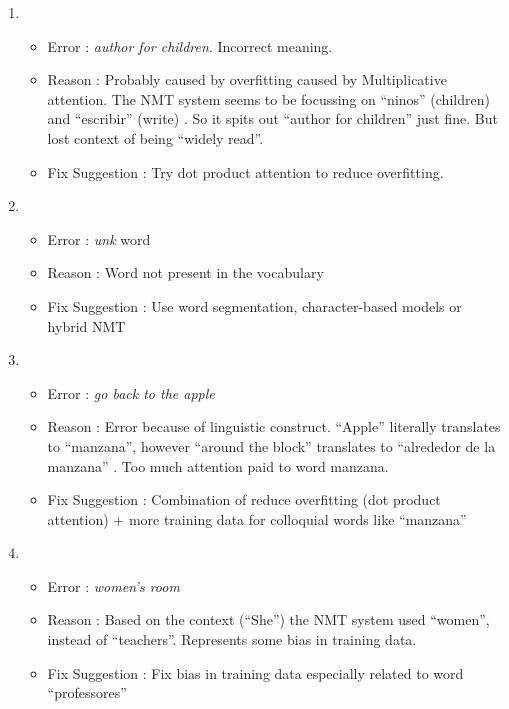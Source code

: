 \documentclass[]{article}
\begin{document}
\begin{enumerate}
\begin{enumerate}
\begin{enumerate}
					\item 	
					\begin{itemize}
						\item Error : \textit{author for children}. Incorrect meaning.
						\item Reason : Probably caused by overfitting caused by Multiplicative attention. The NMT system seems to be focussing on \enquote{ninos} (children) and \enquote{escribir} (write) . So it spits out \enquote{author for children} just fine. But lost context of being \enquote{widely read}.
						\item Fix Suggestion : Try dot product attention to reduce overfitting.
					\end{itemize}
				
					\item 
					\begin{itemize}
						\item Error : \textit{unk} word
						\item Reason : Word not present in the vocabulary 
						\item Fix Suggestion : Use word segmentation, character-based models or hybrid NMT
					\end{itemize}
					
					\item 
					\begin{itemize}
						\item Error : \textit{go back to the apple}
						\item Reason : Error because of linguistic construct.  \enquote{Apple} literally translates to \enquote{manzana}, however \enquote{around the block} translates to \enquote{alrededor de la manzana} . Too much attention paid to word manzana.
						\item Fix Suggestion : Combination of reduce overfitting (dot product attention) + more training data for colloquial words like \enquote{manzana}
					\end{itemize}
					
					\item 
					\begin{itemize}
						\item Error : \textit{women's room}
						\item Reason : Based on the context (\enquote{She}) the NMT system used \enquote{women}, instead of \enquote{teachers}. Represents some bias in training data.
						\item Fix Suggestion : Fix bias in training data especially related to word \enquote{professores}
					\end{itemize}
					

\end{enumerate}
\end{enumerate}
\end{enumerate}
\end{document}
